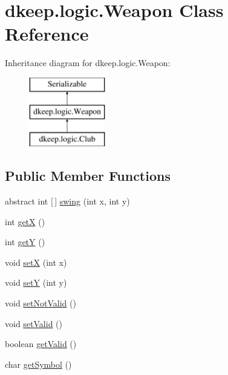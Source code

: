 \hypertarget{classdkeep_1_1logic_1_1_weapon}{}\section{dkeep.\+logic.\+Weapon Class Reference}
\label{classdkeep_1_1logic_1_1_weapon}
Inheritance diagram for dkeep.\+logic.\+Weapon\+:\begin{figure}[H]
\begin{center}
\leavevmode
\includegraphics[height=3.000000cm]{classdkeep_1_1logic_1_1_weapon}
\end{center}
\end{figure}
\subsection*{Public Member Functions}
\begin{DoxyCompactItemize}
\item 
abstract int \mbox{[}$\,$\mbox{]} \hyperlink{classdkeep_1_1logic_1_1_weapon_adb73dd1c376c37614cad2b5ad2e9d1d4}{swing} (int x, int y)
\item 
int \hyperlink{classdkeep_1_1logic_1_1_weapon_a91b3f16c06cb271d31f1aa013c45ce31}{getX} ()
\item 
int \hyperlink{classdkeep_1_1logic_1_1_weapon_a5e47ccc0670cc36854af2dd1f72a70ee}{getY} ()
\item 
void \hyperlink{classdkeep_1_1logic_1_1_weapon_a5be1b0ffe5c917345fad810d83307461}{setX} (int x)
\item 
void \hyperlink{classdkeep_1_1logic_1_1_weapon_a11572cdd07ba03705550964e1d076e9c}{setY} (int y)
\item 
void \hyperlink{classdkeep_1_1logic_1_1_weapon_a93d2e4eb12cf90e2f07d54e7f99e2446}{set\+Not\+Valid} ()
\item 
void \hyperlink{classdkeep_1_1logic_1_1_weapon_a73776355a004878e7ca9a0a32033426f}{set\+Valid} ()
\item 
boolean \hyperlink{classdkeep_1_1logic_1_1_weapon_a68d3c9c406b56366ccfd75cae899bb68}{get\+Valid} ()
\item 
char \hyperlink{classdkeep_1_1logic_1_1_weapon_ad60afd31631a1552c749b5ddd0a5b949}{get\+Symbol} ()
\end{DoxyCompactItemize}
